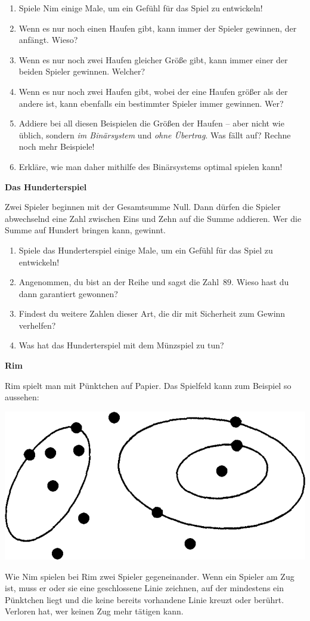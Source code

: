 \documentclass[a4paper,ngerman,14pt]{scrartcl}
\newcommand{\header}[1]{\begin{center}
  \Huge\textbf{\textsf{#1}}
\end{center}}
\begin{document}
\begin{enumerate}
\item Spiele Nim einige Male, um ein Gefühl für das Spiel zu entwickeln!
\item Wenn es nur noch einen Haufen gibt, kann immer der Spieler gewinnen, der
anfängt. Wieso?
\item Wenn es nur noch zwei Haufen gleicher Größe gibt, kann immer einer der
beiden Spieler gewinnen. Welcher?
\item Wenn es nur noch zwei Haufen gibt, wobei der eine Haufen größer als der
andere ist, kann ebenfalls ein bestimmter Spieler immer gewinnen. Wer?
\item Addiere bei all diesen Beispielen die Größen der
Haufen -- aber nicht wie üblich, sondern \emph{im Binärsystem} und \emph{ohne
Übertrag}. Was fällt auf? Rechne noch mehr Beispiele!
\item Erkläre, wie man daher mithilfe des Binärsystems optimal spielen kann!
\end{enumerate}

\newpage

\header{Das Hunderterspiel}

Zwei Spieler beginnen mit der Gesamtsumme Null. Dann
dürfen die Spieler abwechselnd eine Zahl zwischen Eins und Zehn auf die Summe
addieren. Wer die Summe auf Hundert bringen kann, gewinnt.

\begin{enumerate}
\item Spiele das Hunderterspiel einige Male, um ein Gefühl für das Spiel zu
entwickeln!
\item Angenommen, du bist an der Reihe und sagst die Zahl~$89$. Wieso
hast du dann garantiert gewonnen?
\item Findest du weitere Zahlen dieser Art, die dir mit Sicherheit zum Gewinn
verhelfen?
\item Was hat das Hunderterspiel mit dem Münzspiel zu tun?
\end{enumerate}

\newpage

\header{Rim}

Rim spielt man mit Pünktchen auf Papier. Das Spielfeld kann zum Beispiel so
aussehen:
\begin{center}
\includegraphics[scale=0.3]{../rim}
\end{center}
Wie Nim spielen bei Rim zwei Spieler gegeneinander.
Wenn ein Spieler am Zug ist, muss er oder sie
eine geschlossene Linie zeichnen, auf der mindestens ein Pünktchen liegt und
die keine bereits vorhandene Linie kreuzt oder berührt. Verloren hat, wer
keinen Zug mehr tätigen kann.
\end{document}

